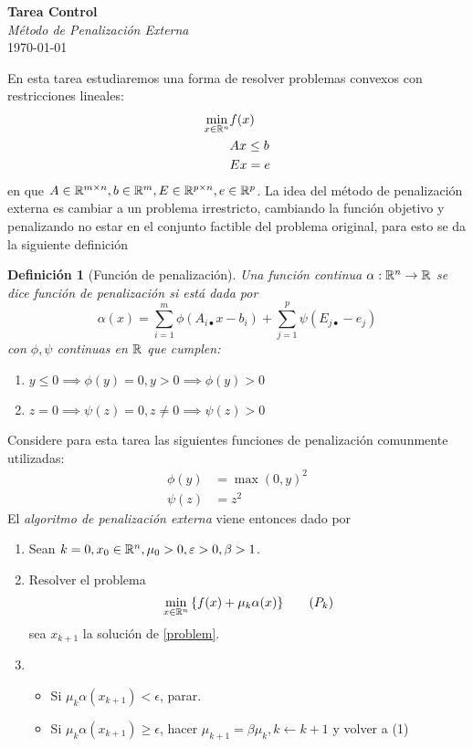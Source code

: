 \documentclass{article}
\newtheorem{definition}{Definición}
\begin{document}


\begin{center}
    \Huge{\textbf{Tarea Control}}\\
\textit{\large{Método de Penalización Externa}}\\
    \normalsize
	\today
\end{center}

En esta tarea estudiaremos una forma de resolver problemas convexos con restricciones lineales:
\begin{align*}
	\min_{x \in \mathbb{R}^n} & f(x) \\
	& Ax \leq b \\
	& Ex = e
\end{align*}
en que \(A \in \mathbb{R}^{m \times n}, b \in \mathbb{R}^m, E \in \mathbb{R}^{p \times n}, e \in \mathbb{R}^p\). La idea del método de penalización externa es cambiar a un problema irrestricto, cambiando la función objetivo y penalizando no estar en el conjunto factible del problema original, para esto se da la siguiente definición
\begin{definition}[Función de penalización]
	Una función continua \(\alpha: \mathbb{R}^n \to \mathbb{R}\) se dice \textit{función de penalización} si está dada por
	\[\alpha(x) = \sum_{i=1}^m \phi(A_{i\bullet} x - b_i) + \sum_{j=1}^p \psi(E_{j\bullet} - e_j)\]
	con \(\phi, \psi\) continuas en \(\mathbb{R}\) que cumplen:
	\begin{enumerate}
		\item[(i)] \(y \leq 0 \implies \phi(y) = 0, y > 0 \implies \phi(y) > 0\)
		\item[(ii)] \(z = 0 \implies \psi(z) = 0, z \neq 0 \implies \psi(z) > 0\)
	\end{enumerate}
\end{definition}
Considere para esta tarea las siguientes funciones de penalización comunmente utilizadas:
\begin{align*}
	\phi(y) &= \max(0, y)^2 \\
	\psi(z) &= z^2
\end{align*}
El \textit{algoritmo de penalización externa} viene entonces dado por
\begin{enumerate}
	\item[(0)] Sean \(k = 0, x_0 \in \mathbb{R}^n, \mu_0 > 0, \varepsilon > 0, \beta > 1\).
	\item[(1)] Resolver el problema
	\begin{equation}\label{problem}
		\min_{x \in \mathbb{R}^n} \qty{f(x) + \mu_k \alpha(x)} \tag{$P_k$}
	\end{equation}
	sea \(x_{k+1}\) la solución de \ref{problem}.
	\item[(2)] \begin{itemize}
		\item Si \(\mu_k\alpha(x_{k+1}) < \epsilon\), parar.
		\item Si \(\mu_k\alpha(x_{k+1}) \geq \epsilon\), hacer \(\mu_{k+1} = \beta \mu_k, k \leftarrow k+1\) y volver a (1)
	\end{itemize}
\end{enumerate}
\end{document}
